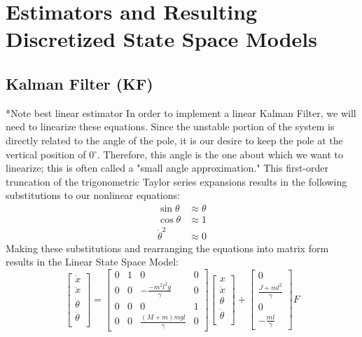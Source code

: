 \documentclass{article}
\begin{document}
\section{Estimators and Resulting Discretized State Space Models}
\subsection{Kalman Filter (KF)}
*Note best linear estimator
In order to implement a linear Kalman Filter, we will need to linearize these equations. Since the unstable portion of the system is directly related to the angle of the pole, it is our desire to keep the pole at the vertical position of 0$^\circ$. Therefore, this angle is the one about which we want to linearize; this is often called a "small angle approximation." This first-order truncation of the trigonometric Taylor series expansions results in the following substitutions to our nonlinear equations:
\begin{align*}
\sin \theta &\approx \theta \\
\cos \theta &\approx 1 \\
\dot{\theta}^2 &\approx 0
\end{align*}
Making these substitutions and rearranging the equations into matrix form results in the Linear State Space Model:
\begin{equation}
\begin{bmatrix}
	\dot{x} \\
	\ddot{x} \\
	\dot{\theta} \\
	\ddot{\theta} \\
\end{bmatrix} = \begin{bmatrix}
0 & 1 & 0 & 0 \\
0 & 0 & -\frac{-m^2l^2g}{\gamma} & 0 \\
0 & 0 & 0 & 1\\
0 & 0 & \frac{(M+m)mgl}{\gamma} & 0
\end{bmatrix} \begin{bmatrix}
	x \\
	\dot{x} \\
	\theta \\
	\dot{\theta} \\
\end{bmatrix}  + \begin{bmatrix}
0 \\
\frac{J+ml^2}{\gamma} \\
0 \\
-\frac{ml}{\gamma}
\end{bmatrix} F
\label{eq:ss_continuous}
\end{equation}
\end{document}

